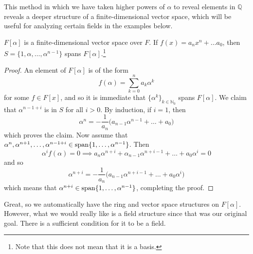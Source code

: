     This method in which we have taken higher powers of $\alpha$ to reveal elements in $\mathbb{Q}$ reveals a deeper structure of a finite-dimensional vector space, which will be useful for analyzing certain fields in the examples below. 

    \begin{lemma}
      $F[\alpha]$ is a finite-dimensional vector space over $F$. If $f(x) = a_n x^n + \ldots a_0$, then $S = \{1, \alpha, \ldots, \alpha^{n-1}\}$ spans $F[\alpha]$.\footnote{Note that this does not mean that it is a basis.} 
    \end{lemma}
    \begin{proof}
      An element of $F[\alpha]$ is of the form 
      \begin{equation}
        f(\alpha) = \sum_{k=0}^n a_k \alpha^k
      \end{equation} 
      for some $f \in F[x]$, and so it is immediate that $\{\alpha^k\}_{k \in \mathbb{N}_0}$ spans $F[\alpha]$. We claim that $\alpha^{n-1+i}$ is in $S$ for all $i > 0$. By induction, if $i = 1$, then 
      \begin{equation}
        \alpha^n = -\frac{1}{a_n} \big( a_{n-1} \alpha^{n-1} + \ldots + a_0 \big)
      \end{equation}
      which proves the claim. Now assume that $\alpha^n, \alpha^{n+1}, \ldots, \alpha^{n-1+i} \in \Span\{1, \ldots, \alpha^{n-1}\}$. Then 
      \begin{equation}
        \alpha^i f(\alpha) = 0 \implies a_n \alpha^{n+i} + \alpha_{n-1} \alpha^{n+i-1} + \ldots + a_0 \alpha^i = 0 
      \end{equation}
      and so 
      \begin{equation}
        \alpha^{n+i} = -\frac{1}{a_n} \big(a_{n-1} \alpha^{n+i-1} + \ldots + a_0 \alpha^i)
      \end{equation}
      which means that $\alpha^{n+i} \in \Span\{1, \ldots, \alpha^{n-1}\}$, completing the proof. 
    \end{proof} 

    Great, so we automatically have the ring and vector space structures on $F[\alpha]$. However, what we would really like is a field structure since that was our original goal. There is a sufficient condition for it to be a field. 

